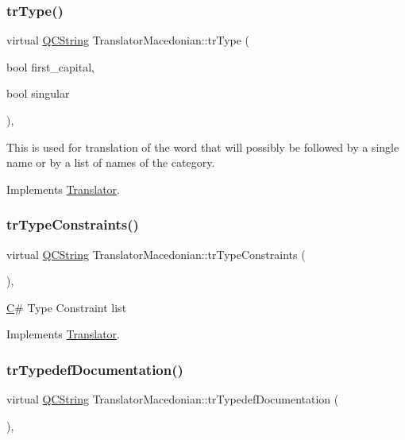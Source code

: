\subsubsection{\texorpdfstring{trType()}{trType()}}
{\footnotesize\ttfamily virtual \mbox{\hyperlink{class_q_c_string}{Q\+C\+String}} Translator\+Macedonian\+::tr\+Type (\begin{DoxyParamCaption}\item[{bool}]{first\+\_\+capital,  }\item[{bool}]{singular }\end{DoxyParamCaption})\hspace{0.3cm}{\ttfamily [inline]}, {\ttfamily [virtual]}}

This is used for translation of the word that will possibly be followed by a single name or by a list of names of the category. 

Implements \mbox{\hyperlink{class_translator}{Translator}}.

\mbox{\label{class_translator_macedonian_ac0220d75809fff7ddb641ce52f9e2253}} 
\subsubsection{\texorpdfstring{trTypeConstraints()}{trTypeConstraints()}}
{\footnotesize\ttfamily virtual \mbox{\hyperlink{class_q_c_string}{Q\+C\+String}} Translator\+Macedonian\+::tr\+Type\+Constraints (\begin{DoxyParamCaption}{ }\end{DoxyParamCaption})\hspace{0.3cm}{\ttfamily [inline]}, {\ttfamily [virtual]}}

\mbox{\hyperlink{class_c}{C}}\# Type Constraint list 

Implements \mbox{\hyperlink{class_translator}{Translator}}.

\mbox{\label{class_translator_macedonian_ae47844c97d6661483642d4d9356968dc}} 
\subsubsection{\texorpdfstring{trTypedefDocumentation()}{trTypedefDocumentation()}}
{\footnotesize\ttfamily virtual \mbox{\hyperlink{class_q_c_string}{Q\+C\+String}} Translator\+Macedonian\+::tr\+Typedef\+Documentation (\begin{DoxyParamCaption}{ }\end{DoxyParamCaption})\hspace{0.3cm}{\ttfamily [inline]}, {\ttfamily [virtual]}}

